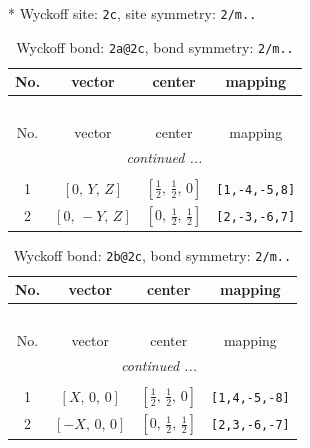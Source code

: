 \documentclass[fleqn,8pt]{jsarticle}
\begin{document}
* Wyckoff site: {\tt 2c}, site symmetry: {\tt 2/m..}
\renewcommand{\arraystretch}{1.2}
\begin{longtable}{cccc}
\caption{Wyckoff bond: {\tt 2a@2c}, bond symmetry: {\tt 2/m..}}
 \\
 \hline \hline
No. & vector & center & mapping \\ \hline \endfirsthead

\multicolumn{3}{l}{\tablename\ \thetable{}} \\
 \hline \hline
No. & vector & center & mapping \\ \hline \endhead

 \hline \hline
\multicolumn{3}{r}{\footnotesize\it continued ...} \\ \endfoot

 \hline \hline
\multicolumn{3}{r}{} \\ \endlastfoot

1 & $\left[ 0,\, Y,\, Z \right]$ & $\left[ \frac{1}{2},\, \frac{1}{2},\, 0 \right]$ & {\tt [1,-4,-5,8]} \\ \hline
2 & $\left[ 0,\, - Y,\, Z \right]$ & $\left[ 0,\, \frac{1}{2},\, \frac{1}{2} \right]$ & {\tt [2,-3,-6,7]} \\
\end{longtable}
\renewcommand{\arraystretch}{1.2}
\begin{longtable}{cccc}
\caption{Wyckoff bond: {\tt 2b@2c}, bond symmetry: {\tt 2/m..}}
 \\
 \hline \hline
No. & vector & center & mapping \\ \hline \endfirsthead

\multicolumn{3}{l}{\tablename\ \thetable{}} \\
 \hline \hline
No. & vector & center & mapping \\ \hline \endhead

 \hline \hline
\multicolumn{3}{r}{\footnotesize\it continued ...} \\ \endfoot

 \hline \hline
\multicolumn{3}{r}{} \\ \endlastfoot

1 & $\left[ X,\, 0,\, 0 \right]$ & $\left[ \frac{1}{2},\, \frac{1}{2},\, 0 \right]$ & {\tt [1,4,-5,-8]} \\ \hline
2 & $\left[ - X,\, 0,\, 0 \right]$ & $\left[ 0,\, \frac{1}{2},\, \frac{1}{2} \right]$ & {\tt [2,3,-6,-7]} \\
\end{longtable}
\renewcommand{\arraystretch}{1.2}
\end{document}
